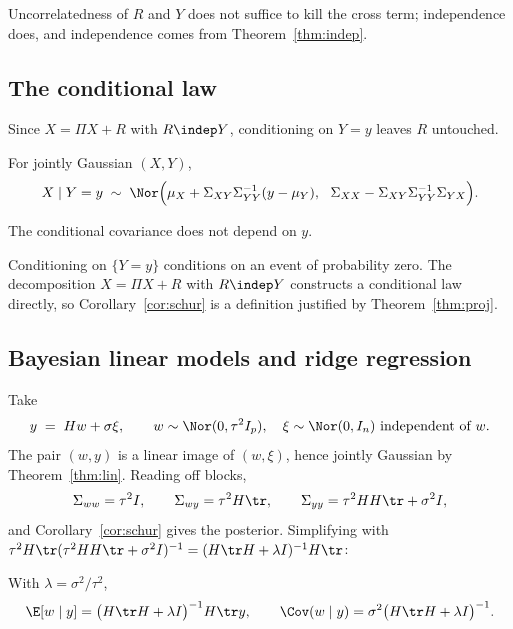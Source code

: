 \documentclass[11pt]{article}
\begin{document}
\begin{remark}
Uncorrelatedness of $R$ and $Y$ does not suffice to kill the cross term; independence does, and independence comes from Theorem~\ref{thm:indep}.
\end{remark}

\subsection{The conditional law}

Since $X=\Pi X+R$ with $R\indep Y$, conditioning on $Y=y$ leaves $R$ untouched.

\begin{corollary}\label{cor:schur}
For jointly Gaussian $(X,Y)$,
\[
X\mid Y=y\;\sim\;\Nor\Big(\mu_X+\Sigma_{XY}\Sigma_{YY}^{-1}(y-\mu_Y),\ \ \Sigma_{XX}-\Sigma_{XY}\Sigma_{YY}^{-1}\Sigma_{YX}\Big).
\]
\end{corollary}

\begin{remark}
The conditional covariance does not depend on $y$.
\end{remark}

\begin{remark}
Conditioning on $\{Y=y\}$ conditions on an event of probability zero. The decomposition $X=\Pi X+R$ with $R\indep Y$ constructs a conditional law directly, so Corollary~\ref{cor:schur} is a definition justified by Theorem~\ref{thm:proj}.
\end{remark}

\subsection{Bayesian linear models and ridge regression}

Take
\[
y \;=\; Hw+\sigma\xi,\qquad w\sim\Nor(0,\tau^2 I_p),\quad \xi\sim\Nor(0,I_n)\ \text{independent of } w .
\]
The pair $(w,y)$ is a linear image of $(w,\xi)$, hence jointly Gaussian by Theorem~\ref{thm:lin}. Reading off blocks,
\[
\Sigma_{ww}=\tau^2 I,\qquad \Sigma_{wy}=\tau^2H\tr,\qquad \Sigma_{yy}=\tau^2HH\tr+\sigma^2I,
\]
and Corollary~\ref{cor:schur} gives the posterior. Simplifying with $\tau^2H\tr(\tau^2HH\tr+\sigma^2I)^{-1}=(H\tr H+\lambda I)^{-1}H\tr$:

\begin{proposition}\label{prop:ridge}
With $\lambda=\sigma^2/\tau^2$,
\[
\E[w\mid y]=\big(H\tr H+\lambda I\big)^{-1}H\tr y,
\qquad
\Cov(w\mid y)=\sigma^2\big(H\tr H+\lambda I\big)^{-1}.
\]
\end{proposition}
\end{document}
